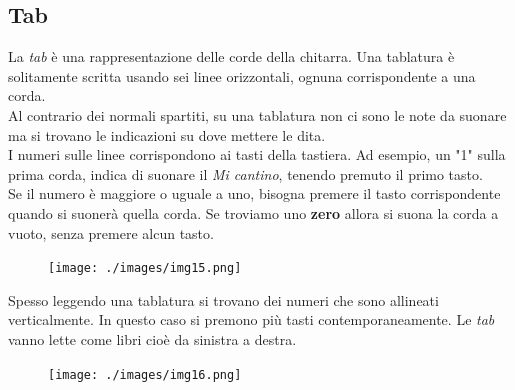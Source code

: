 \subsection{Tab}
La \textit{tab} è una rappresentazione delle corde della chitarra. Una tablatura è solitamente scritta usando sei linee orizzontali, ognuna corrispondente a una corda.\\
Al contrario dei normali spartiti, su una tablatura non ci sono le note da suonare ma si trovano le indicazioni su dove mettere le dita.\\I numeri sulle linee corrispondono ai tasti della tastiera. Ad esempio, un "1" sulla prima corda, indica di suonare il \textit{Mi cantino}, tenendo premuto il primo tasto.\\
Se il numero è maggiore o uguale a uno, bisogna premere il tasto corrispondente quando si suonerà quella corda. Se troviamo uno \textbf{zero} allora si suona la corda a vuoto, senza premere alcun tasto.
\begin{figure}[H]
	\centering
	\texttt{[image: ./images/img15.png]}
\end{figure}
\noindent Spesso leggendo una tablatura si trovano dei numeri che sono allineati verticalmente. In questo caso si premono più tasti contemporaneamente. Le \textit{tab} vanno lette come libri cioè da sinistra a destra.
\begin{figure}[H]
	\centering
	\texttt{[image: ./images/img16.png]}
\end{figure}